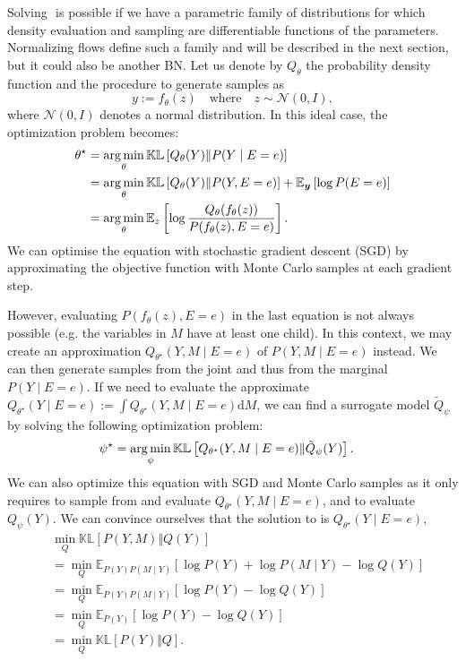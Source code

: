 Solving $\label{eq:obj_VI}$ is possible if we have a parametric family of distributions for which density evaluation and sampling are differentiable functions of the parameters. Normalizing flows define such a family and will be described in the next section, but it could also be another BN. Let us denote by $Q_\theta$ the probability density function and the procedure to generate samples as $$ y := f_\theta(z) \quad\text{where}\quad z\sim \mathcal{N}(0, I),$$
where $\mathcal{N}(0, I)$ denotes a normal distribution.
In this ideal case, the optimization problem becomes:
\begin{align}
  \theta^\star &= \operatorname*{arg\,min}_\theta \mathbb{KL}\left[Q_\theta(Y)\Vert P(Y\mid E=e) \right]\\ \label{eq:VI_optim}
  &= \operatorname*{arg\,min}_\theta \mathbb{KL}\left[Q_\theta(Y)\Vert P(Y, E=e) \right] + \mathbb{E}_{\bm y}\left[\log P(E=e)\right]\\
  &= \operatorname*{arg\,min}_\theta \mathbb{E}_{z}\left[ \log \frac{Q_\theta(f_\theta(z))}{P(f_\theta(z), E=e)} \right].
\end{align}
We can optimise the equation with stochastic gradient descent (SGD) by approximating the objective function with Monte Carlo samples at each gradient step.

However, evaluating $P(f_\theta(z), E=e)$ in the last equation is not always possible (e.g. the variables in $M$ have at least one child). In this context, we may create an approximation $Q_{\theta^\star}(Y, M\mid E=e)$ of $P(Y, M\mid E=e)$ instead. We can then generate samples from the joint and thus from the marginal $P(Y\mid E=e)$. If we need to evaluate the approximate $Q_{\theta^\star}(Y\mid E=e) := \int Q_{\theta^\star}(Y, M\mid E=e) \text{d}M$, we can find a surrogate model $\tilde Q_\psi$ by solving the following optimization problem:
\begin{align}
  \psi^\star &= \operatorname*{arg\,min}_\psi \mathbb{KL}\left[Q_{\theta^\star}(Y, M\mid E=e)\Vert \tilde Q_\psi(Y) \right]. \label{eq:approx_posterior}
\end{align}
We can also optimize this equation with SGD and Monte Carlo samples as it only requires to sample from and evaluate $Q_{\theta^\star}(Y, M\mid E=e)$, and to evaluate $Q_\psi(Y)$. We can convince ourselves that the solution to  is $Q_{\theta^\star}(Y\mid E=e)$,
\begin{align}
  &\min_Q \mathbb{KL}\left[P(Y, M)\Vert Q(Y) \right]\\
  &=\min_Q \mathbb{E}_{P(Y) P(M\mid Y)}\left[\log P(Y) + \log P(M\mid Y) - \log Q(Y)\right]\\
  &=\min_Q \mathbb{E}_{P(Y) P(M\mid Y)}\left[\log P(Y) - \log Q(Y)\right]\\
  &= \min_Q \mathbb{E}_{P(Y)}\left[\log P(Y) - \log Q(Y)\right]\\
  &= \min_Q \mathbb{KL}\left[P(Y)\Vert Q \right].
\end{align}

